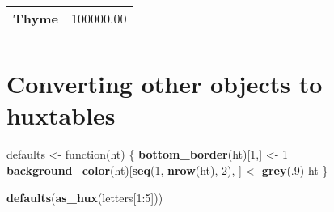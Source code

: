 \documentclass[]{article}
\newenvironment{Shaded}{\begin{snugshade}}{\end{snugshade}}
\newcommand{\KeywordTok}[1]{\textcolor[rgb]{0.13,0.29,0.53}{\textbf{{#1}}}}
\newcommand{\DecValTok}[1]{\textcolor[rgb]{0.00,0.00,0.81}{{#1}}}
\newcommand{\StringTok}[1]{\textcolor[rgb]{0.31,0.60,0.02}{{#1}}}
\newcommand{\NormalTok}[1]{{#1}}
\begin{document}
\begin{table}[h]
\begin{centering}
\begin{tabularx}{0.25\textwidth}{p{} p{}}
\multicolumn{1}{p{0.125\textwidth}}{\raggedright\rule{0pt}{\baselineskip+4pt}\hspace*{4pt}\textbf{Thyme}\hspace*{4pt}\rule[-4pt]{0pt}{4pt}} & \multicolumn{1}{p{0.125\textwidth}}{\raggedright\rule{0pt}{\baselineskip+4pt}\hspace*{4pt}100000.00\hspace*{4pt}\rule[-4pt]{0pt}{4pt}} \tabularnewline[-0.5pt]
\hhline{>{\arrayrulecolor{black}}->{\arrayrulecolor{black}}-}
\arrayrulecolor{black}
\end{tabularx}
\par\end{centering}
\end{table}

\FloatBarrier

\section{Converting other objects to
huxtables}\label{converting-other-objects-to-huxtables}

\begin{Shaded}
\begin{Highlighting}[]
\NormalTok{defaults <-}\StringTok{ }\NormalTok{function(ht) \{}
  \KeywordTok{bottom_border}\NormalTok{(ht)[}\DecValTok{1}\NormalTok{,] <-}\StringTok{ }\DecValTok{1}
  \KeywordTok{background_color}\NormalTok{(ht)[}\KeywordTok{seq}\NormalTok{(}\DecValTok{1}\NormalTok{, }\KeywordTok{nrow}\NormalTok{(ht), }\DecValTok{2}\NormalTok{), ] <-}\StringTok{ }\KeywordTok{grey}\NormalTok{(.}\DecValTok{9}\NormalTok{)}
  \NormalTok{ht}
\NormalTok{\}}
\end{Highlighting}
\end{Shaded}

\FloatBarrier

\begin{Shaded}
\begin{Highlighting}[]
\KeywordTok{defaults}\NormalTok{(}\KeywordTok{as_hux}\NormalTok{(letters[}\DecValTok{1}\NormalTok{:}\DecValTok{5}\NormalTok{]))}
\end{Highlighting}
\end{Shaded}
\end{document}
